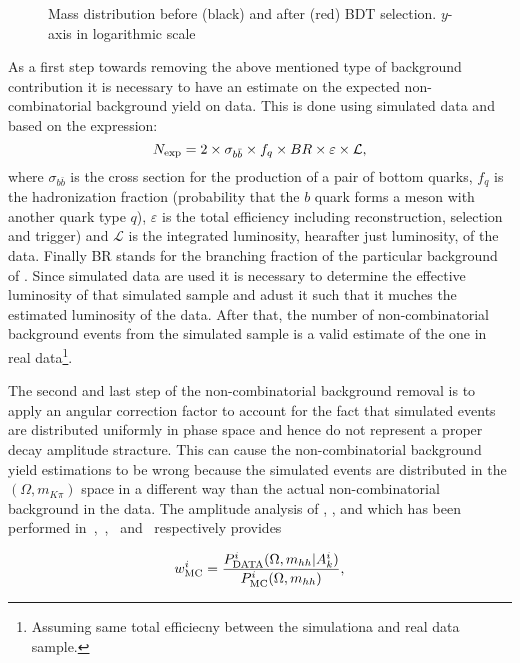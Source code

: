 \begin{figure}[t]
  \centering
  \scalebox{1}{}
  \caption{Mass distribution before (black) and after (red) BDT selection. $y$-axis in logarithmic scale}
  \label{mass_BDTG_selection}
\end{figure}

As a first step towards removing the above mentioned type of background contribution it is necessary to have an estimate
on the expected non-combinatorial background yield on data. This is done using simulated data and based on the expression:
\begin{equation}
N_{\rm exp} = 2 \times \sigma_{b\bar{b}}\times f_q \times BR \times \varepsilon \times {\mathcal{L}},
\end{equation}
\noindent where $\sigma_{b\bar{b}}$ is the cross section for the production of a pair of bottom quarks, $f_q$ is the hadronization fraction
(probability that the $b$ quark forms a meson with another quark type $q$), $\varepsilon$ is the total efficiency including reconstruction,
selection and trigger) and ${\mathcal{L}}$ is the integrated luminosity, hearafter just luminosity, of the data. Finally BR stands for the
branching fraction of the particular background of . Since simulated data are used it is necessary to determine
the effective luminosity of that simulated sample and adust it such that it muches the estimated luminosity of the data. After that, the
number of non-combinatorial background events from the simulated sample is a valid estimate of the one in real
data\footnote{Assuming same total efficiecny between the simulationa and real data sample.}.

The second and last step of the non-combinatorial background removal is to apply an angular correction factor to account for the fact that
simulated events are distributed uniformly in phase space and hence do not represent a proper decay amplitude stracture.
This can cause the non-combinatorial background yield estimations to be wrong because the simulated events are distributed in the $(\Omega, m_{K\pi})$ space
in a different way than the actual non-combinatorial background in the data. The amplitude analysis of \BdJpsipipi, \BsJpsipipi, \BsJpsiKK and \LbJpsipK
which has been performed in~\cite{SheldonBdpipi},~\cite{SheldonBspipi},~\cite{SheldonKK} and~\cite{Gao:1701984} respectively provides

\begin{equation}
\centering
w_{\rm MC}^i = \frac{P_{\rm DATA}^i (\Omega, m_{hh}  | A_k^i)} {P_{\rm MC}^i(\Omega, m_{hh})},
\end{equation}

